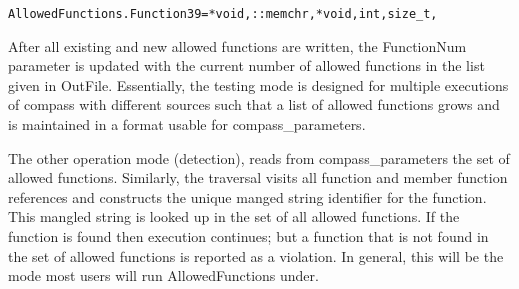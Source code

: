 \begin{verbatim}
AllowedFunctions.Function39=*void,::memchr,*void,int,size_t,
\end{verbatim}

After all existing and new allowed functions are written, the FunctionNum
parameter is updated with the current number of allowed functions in the list
given in OutFile. Essentially, the testing mode is designed for multiple
executions of compass with different sources such that a list of allowed
functions grows and is maintained in a format usable for compass\_parameters.

The other operation mode (detection), reads from compass\_parameters the set 
of allowed functions. Similarly, the traversal visits all function and
member function references and constructs the unique manged string identifier
for the function. This mangled string is looked up in the set of all allowed
functions. If the function is found then execution continues; but a function
that is not found in the set of allowed functions is reported as a violation.
In general, this will be the mode most users will run AllowedFunctions under.
